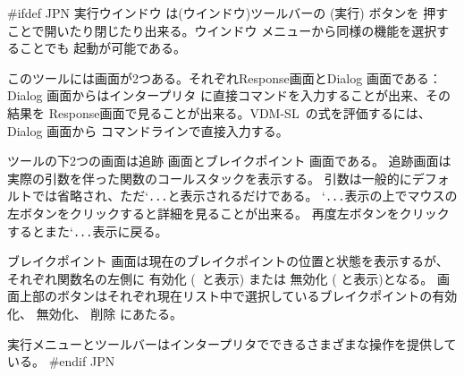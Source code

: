 \documentclass[\pformat,12pt]{article}
\newcommand{\vdmslpp}{VDM-SL}
\newcommand{\vdmslpp}{VDM++}
\newcommand{\Lit}[1]{`#1\Quote}
\newcommand{\Sig}[1]{\Lit{{\tt #1}}}
\newcommand{\guicmd}[1]{{\sf #1}}
\newcommand{\guicmd}[1]{{\gt #1}}
\begin{document}
#ifdef JPN
\guicmd{実行ウインドウ} は(\guicmd{ウインドウ})ツールバーの
(\guicmd{実行}) ボタンを
押すことで開いたり閉じたり出来る。\guicmd{ウインドウ} メニューから同様の機能を選択することでも
起動が可能である。

このツールには画面が2つある。それぞれ\guicmd{Response}画面と\guicmd{Dialog} 画面である：
\guicmd{Dialog} 画面からは\guicmd{インタープリタ} に直接コマンドを入力することが出来、その結果を
\guicmd{Response}画面で見ることが出来る。\vdmslpp\ の式を評価するには、\guicmd{Dialog} 画面から
コマンドラインで直接入力する。

ツールの下2つの画面は\guicmd{追跡} 画面と\guicmd{ブレイクポイント} 画面である。
\guicmd{追跡}画面は実際の引数を伴った関数のコールスタックを表示する。
引数は一般的にデフォルトでは省略され、ただ\Sig{...}と表示されるだけである。
\Sig{...}表示の上でマウスの左ボタンをクリックすると詳細を見ることが出来る。
再度左ボタンをクリックするとまた\Sig{...}表示に戻る。


\guicmd{ブレイクポイント} 画面は現在のブレイクポイントの位置と状態を表示するが、それぞれ関数名の左側に
\guicmd{有効化} (\raisebox{0.5mm}{{\fbox{\tt\tiny
      $\surd$}}}\ と表示) または
\guicmd{無効化} (
\raisebox{1mm}{{\fbox{\rule[-0.75mm]{0mm}{1.5mm}{\hspace*{1.5mm}}}}}と表示)となる。
画面上部のボタンはそれぞれ現在リスト中で選択しているブレイクポイントの有効化、
無効化、
削除 にあたる。

\guicmd{実行}メニューとツールバーはインタープリタでできるさまざまな操作を提供している。
#endif JPN
\end{document}
